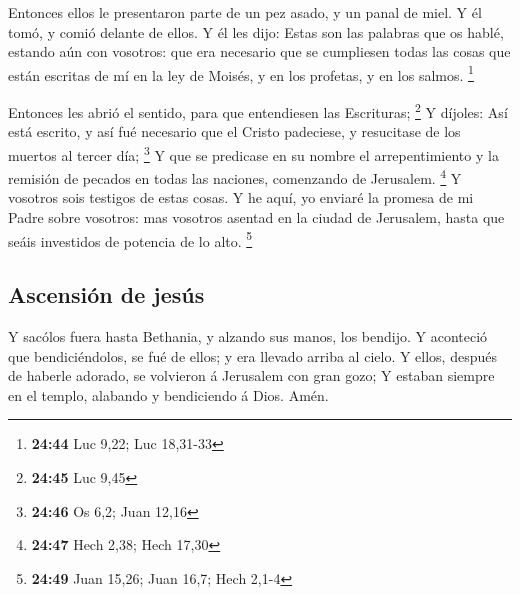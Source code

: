  Entonces ellos le presentaron parte de un pez asado, y
un panal de miel.  Y él tomó, y comió delante de ellos.
 Y él les dijo: Estas son las palabras que os hablé,
estando aún con vosotros: que era necesario que se cumpliesen todas las
cosas que están escritas de mí en la ley de Moisés, y en los profetas, y
en los salmos. \footnote{\textbf{24:44} Luc 9,22; Luc 18,31-33}

 Entonces les abrió el sentido, para que entendiesen las
Escrituras; \footnote{\textbf{24:45} Luc 9,45}  Y
díjoles: Así está escrito, y así fué necesario que el Cristo padeciese,
y resucitase de los muertos al tercer día; \footnote{\textbf{24:46} Os
  6,2; Juan 12,16}  Y que se predicase en su nombre el
arrepentimiento y la remisión de pecados en todas las naciones,
comenzando de Jerusalem. \footnote{\textbf{24:47} Hech 2,38; Hech 17,30}
 Y vosotros sois testigos de estas cosas. 
Y he aquí, yo enviaré la promesa de mi Padre sobre vosotros: mas
vosotros asentad en la ciudad de Jerusalem, hasta que seáis investidos
de potencia de lo alto. \footnote{\textbf{24:49} Juan 15,26; Juan 16,7;
  Hech 2,1-4}

\hypertarget{ascensiuxf3n-de-jesuxfas}{%
\subsection{Ascensión de jesús}\label{ascensiuxf3n-de-jesuxfas}}

 Y sacólos fuera hasta Bethania, y alzando sus manos, los
bendijo.  Y aconteció que bendiciéndolos, se fué de
ellos; y era llevado arriba al cielo.  Y ellos, después
de haberle adorado, se volvieron á Jerusalem con gran gozo;
 Y estaban siempre en el templo, alabando y bendiciendo á
Dios. Amén.
